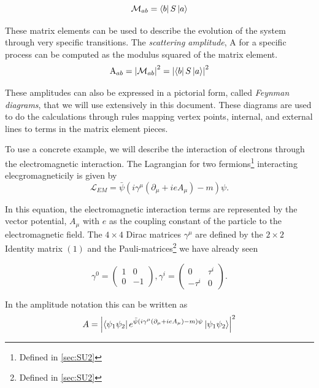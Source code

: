 \begin{equation}
\label{eq:bSa}
\mathcal{M}_{ab} = \bra{b}S\ket{a}
\end{equation}

These matrix elements can be used to describe the evolution of the system through very specific transitions. The \textit{scattering amplitude}, $\mathrm{A}$ for a specific process can be computed as the modulus squared of the matrix element.
\begin{equation}
\label{eq:Amplitude}
\mathrm{A}_{ab} = \left|\mathcal{M}_{ab}\right|^{2} = \left|\bra{b}S\ket{a}\right|^{2}
\end{equation}

These amplitudes can also be expressed in a pictorial form, called \textit{Feynman diagrams}, that we will use extensively in this document. These diagrams are used to do the calculations through rules mapping vertex points, internal, and external lines to terms in the matrix element pieces.


To use a concrete example, we will describe the interaction of electrons through the electromagnetic interaction. The Lagrangian for two fermions\footnote{Defined in \ref{sec:SU2}} interacting elecgromagneticily is given by 
\begin{equation}
\label{eq:EMlagrangian}
\mathcal{L}_{EM} = \bar{\psi} \left(i\gamma^{\mu}\left(\partial_{\mu} + ieA_{\mu}\right) - m\right)\psi.
\end{equation}

In this equation, the electromagnetic interaction terms are represented by the vector potential, $A_{\mu}$ with $e$ as the coupling constant of the particle to the electromagnetic field. The $4 \times 4$ Dirac matrices $\gamma^{\mu}$ are defined by the $2 \times 2$ Identity matrix $\left(1\right)$ and the Pauli-matrices\footnote{Defined in \ref{sec:SU2}} we have already seen

\begin{equation}
\label{eq:GammaMatrix}
\gamma^{0} = \begin{pmatrix} 1 & 0 \\
					       0 & -1 \end{pmatrix},
\gamma^{i} = \begin{pmatrix} 0 & \tau^{i} \\
                                               -\tau^{i} & 0 \end{pmatrix}.
\end{equation}

In the amplitude notation this can be written as
\begin{equation}
\label{eq:eeScatteringAmpl}
A = \left|\bra{\psi_{1}\psi_{2}}e^{\bar{\psi}\left(i\gamma^{\mu}\left(\partial_{\mu} + ieA_{\mu}\right) - m\right)\psi}\ket{\psi_{1}\psi_{2}}\right|^{2}
\end{equation}

